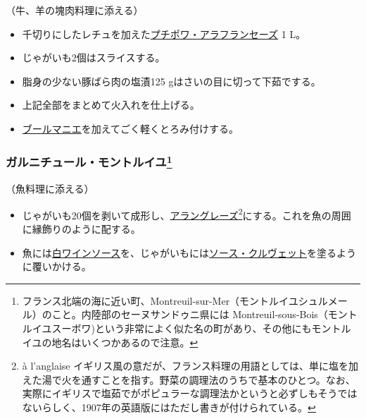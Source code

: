 \begin{recette}


（牛、羊の塊肉料理に添える）

\begin{itemize}
\item
  千切りにしたレチュを加えた\protect\hyperlink{petits-pois-a-la-francaise}{プチポワ・アラフランセーズ}
  1 L。
\item
  じゃがいも2個はスライスする。
\item
  脂身の少ない豚ばら肉の塩漬125 gはさいの目に切って下茹でする。
\item
  上記全部をまとめて火入れを仕上げる。
\item
  \protect\hyperlink{beurre-manie}{ブールマニエ}を加えてごく軽くとろみ付けする。
\end{itemize}

\atoaki{}

\hypertarget{garniture-montreuil}{%
\subsubsection[ガルニチュール・モントルイユ]{\texorpdfstring{ガルニチュール・モントルイユ\footnote{フランス北端の海に近い町、Montreuil-sur-Mer（モントルイユシュルメール）のこと。内陸部のセーヌサンドゥニ県には
  Montreuil-sous-Bois（モントルイユスーボワ)という非常によく似た名の町があり、その他にもモントルイユの地名はいくつかあるので注意。}}{ガルニチュール・モントルイユ}}\label{garniture-montreuil}}


  

（魚料理に添える）

\begin{itemize}
\item
  じゃがいも20個を剥いて成形し、\protect\hyperlink{pommes-de-terres-a-l-anglaise}{アラングレーズ}\footnote{à
    l'anglaise
    イギリス風の意だが、フランス料理の用語としては、単に塩を加えた湯で火を通すことを指す。野菜の調理法のうちで基本のひとつ。なお、実際にイギリスで塩茹でがポピュラーな調理法かというと必ずしもそうではないらしく、1907年の英語版にはただし書きが付けられている。}にする。これを魚の周囲に縁飾りのように配する。
\item
  魚には\protect\hyperlink{sauce-vin-blanc}{白ワインソース}を、じゃがいもには\protect\hyperlink{sauce-aux-crevettes}{ソース・クルヴェット}を塗るように覆いかける。
\end{itemize}


\end{recette}
